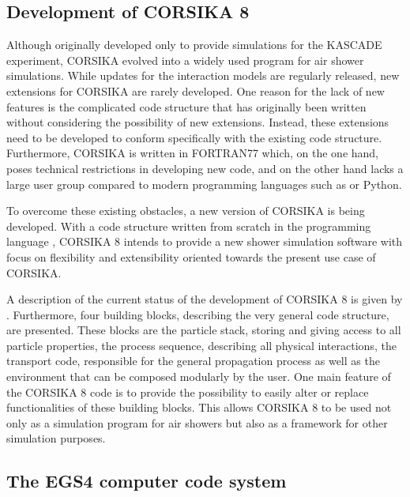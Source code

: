 \subsection{Development of CORSIKA 8}

Although originally developed only to provide simulations for the KASCADE experiment, CORSIKA evolved into a widely used program for air shower simulations.
While updates for the interaction models are regularly released, new extensions for CORSIKA are rarely developed.
One reason for the lack of new features is the complicated code structure that has originally been written without considering the possibility of new extensions.
Instead, these extensions need to be developed to conform specifically with the existing code structure.
Furthermore, CORSIKA is written in FORTRAN77 which, on the one hand, poses technical restrictions in developing new code, and on the other hand lacks a large user group compared to modern programming languages such as \CC or Python.

To overcome these existing obstacles, a new version of CORSIKA is being developed.
With a code structure written from scratch in the programming language \CC, CORSIKA 8 intends to provide a new shower simulation software with focus on flexibility and extensibility oriented towards the present use case of CORSIKA.

A description of the current status of the development of CORSIKA 8 is given by \cite{corsika8}.
Furthermore, four building blocks, describing the very general code structure, are presented.
These blocks are the particle stack, storing and giving access to all particle properties, the process sequence, describing all physical interactions, the transport code, responsible for the general propagation process as well as the environment that can be composed modularly by the user.
One main feature of the CORSIKA 8 code is to provide the possibility to easily alter or replace functionalities of these building blocks.
This allows CORSIKA 8 to be used not only as a simulation program for air showers but also as a framework for other simulation purposes.


\subsection{The EGS4 computer code system}
\label{sec:egs4}

